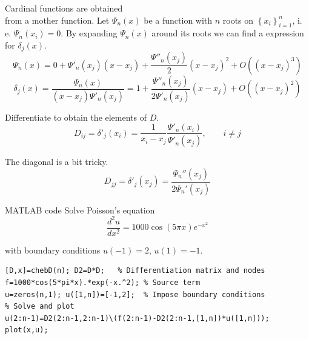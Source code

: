 \documentclass[xcolor={dvipsnames}]{beamer}
\begin{document}
\begin{frame}{Cardinal functions are obtained\\from a mother function.}{}
Let $\Psi_n(x)$ be a function with $n$ roots on $\left\{x_i\right\}_{i=1}^n$, i. e. $\Psi_n(x_i)=0$.  By expanding $\Psi_n(x)$ around its roots we can find a expression for $\delta_j(x)$.
\pause
\begin{equation*}
\Psi_n(x)=0+\Psi'_n(x_j)(x-x_j)+\frac{\Psi''_n(x_j)}{2}(x-x_j)^2+O((x-x_j)^3)
\end{equation*}
\pause
\begin{equation*}
\delta_j(x)=\frac{\Psi_n(x)}{(x-x_j)\Psi'_n(x_j)}=1+\frac{\Psi''_n(x_j)}{2\Psi'_n(x_j)}(x-x_j)+O((x-x_j)^2)
\end{equation*}
\end{frame}


\begin{frame}{Differentiate to obtain the elements of $D$.}{}
\begin{equation*}
D_{ij}=\delta'_j(x_i)=\frac{1}{x_i-x_j}\frac{\Psi'_n(x_i)}{\Psi'_n(x_j)}, \qquad i\neq j
\end{equation*}

\bigskip
The diagonal is a bit tricky.
\begin{equation*}
D_{jj}=\delta'_j(x_j)=\frac{\Psi_n''(x_j)}{2\Psi_n'(x_j)}
\end{equation*}
\end{frame}

\begin{frame}[fragile]{MATLAB code}{}
Solve Poisson's equation
\begin{equation*}
\frac{d^2u}{dx^2}=1000\cos(5\pi x)e^{-x^2}
\end{equation*}

with boundary conditions $u(-1)=2$, $u(1)=-1$.
\pause
\begin{lstlisting}
[D,x]=chebD(n); D2=D*D;   % Differentiation matrix and nodes
f=1000*cos(5*pi*x).*exp(-x.^2); % Source term
u=zeros(n,1); u([1,n])=[-1,2];  % Impose boundary conditions
% Solve and plot
u(2:n-1)=D2(2:n-1,2:n-1)\(f(2:n-1)-D2(2:n-1,[1,n])*u([1,n]));
plot(x,u);
\end{lstlisting}
\end{frame}
\end{document}
